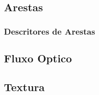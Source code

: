 \subsection{Arestas}
	\subsubsection{Descritores de Arestas}

\subsection{Fluxo Optico}
\subsection{Textura}